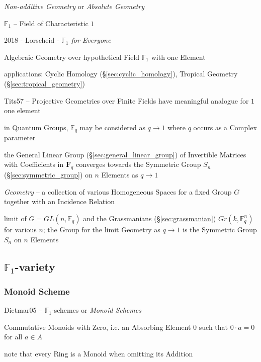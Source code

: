 \begin{itemize}
\begin{itemize}
\emph{Non-additive Geometry} or \emph{Absolute Geometry}

$\mathbb{F}_1$ -- Field of Characteristic $1$

2018 - Lorscheid - \emph{$\mathbb{F}_1$ for Everyone}

Algebraic Geometry over hypothetical Field $\mathbb{F}_1$ with one Element

applications: Cyclic Homology (\S\ref{sec:cyclic_homology}), Tropical Geometry
(\S\ref{sec:tropical_geometry})

Tits57 -- Projective Geometries over Finite Fields have meaningful analogue for
$1$ one element

in Quantum Groups, $\mathbb{F}_q$ may be considered as $q \rightarrow 1$ where
$q$ occurs as a Complex parameter

the General Linear Group (\S\ref{sec:general_linear_group}) of Invertible
Matrices with Coefficients in $\mathbf{F}_q$ converges towards the Symmetric
Group $S_n$ (\S\ref{sec:symmetric_group}) on $n$ Elements as $q \rightarrow 1$

\emph{Geometry} -- a collection of various Homogeneous Spaces for a fixed Group
$G$ together with an Incidence Relation

limit of $G = GL(n,\mathbb{F}_q)$ and the Grassmanians (\S\ref{sec:grassmanian})
$Gr(k,\mathbb{F}^n_q)$ for various $n$; the Group for the limit Geometry as
$q \rightarrow 1$ is the Symmetric Group $S_n$ on $n$ Elements



\subsection{$\mathbb{F}_1$-variety}\label{sec:f1_variety}

\subsubsection{Monoid Scheme}\label{sec:monoid_variety}

Dietmar05 -- $\mathbb{F}_1$-schemes or \emph{Monoid Schemes}

Commutative Monoids with Zero, i.e. an Absorbing Element $0$ such that $0 \cdot
a = 0$ for all $a \in A$

note that every Ring is a Monoid when omitting its Addition




\end{itemize}
\end{itemize}
